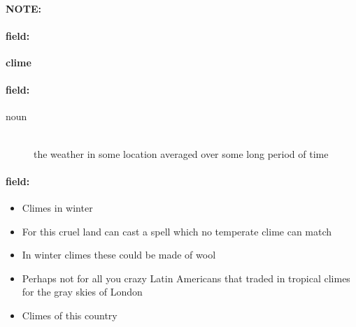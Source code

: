 \documentclass[12pt]{article}
\newenvironment{note}{\paragraph{NOTE:}}{}
\newenvironment{field}{\paragraph{field:}}{}
\begin{document}
\begin{note}
\begin{field}
\textbf{\large clime}
\end{field}


\begin{field}
\begin{description}
\item[noun] \hfill \\ 
the weather in some location averaged over some long period of time

\end{description}
\end{field}

\begin{field}
\begin{itemize}
\item Climes in winter
\item For this cruel land can cast a spell which no temperate clime can match
\item In winter climes these could be made of wool
\item Perhaps not for all you crazy Latin Americans that traded in tropical climes for the gray skies of London
\item Climes of this country
\end{itemize}
\end{field}
\end{note}
\end{document}
